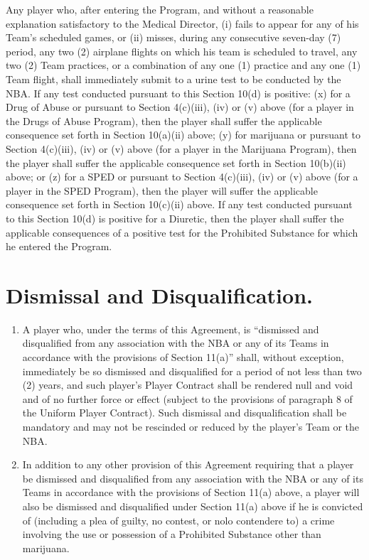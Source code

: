 \documentclass[
]{book}
\providecommand{\tightlist}{%
  \setlength{\itemsep}{0pt}\setlength{\parskip}{0pt}}
\begin{document}
\begin{enumerate}
  Any player who, after entering the Program, and without a reasonable explanation satisfactory to the Medical Director, (i) fails to appear for any of his Team's scheduled games, or (ii) misses, during any consecutive seven-day (7) period, any two (2) airplane flights on which his team is scheduled to travel, any two (2) Team practices, or a combination of any one (1) practice and any one (1) Team flight, shall immediately submit to a urine test to be conducted by the NBA. If any test conducted pursuant to this Section 10(d) is positive: (x) for a Drug of Abuse or pursuant to Section 4(c)(iii), (iv) or (v) above (for a player in the Drugs of Abuse Program), then the player shall suffer the applicable consequence set forth in Section 10(a)(ii) above; (y) for marijuana or pursuant to Section 4(c)(iii), (iv) or (v) above (for a player in the Marijuana Program), then the player shall suffer the applicable consequence set forth in Section 10(b)(ii) above; or (z) for a SPED or pursuant to Section 4(c)(iii), (iv) or (v) above (for a player in the SPED Program), then the player will suffer the applicable consequence set forth in Section 10(c)(ii) above. If any test conducted pursuant to this Section 10(d) is positive for a Diuretic, then the player shall suffer the applicable consequences of a positive test for the Prohibited Substance for which he entered the Program.
\end{enumerate}

\hypertarget{dismissal-and-disqualification.}{%
\section{Dismissal and Disqualification.}\label{dismissal-and-disqualification.}}

\begin{enumerate}
\def\labelenumi{(\alph{enumi})}
\tightlist
\item
  A player who, under the terms of this Agreement, is ``dismissed and disqualified from any association with the NBA or any of its Teams in accordance with the provisions of Section 11(a)'' shall, without exception, immediately be so dismissed and disqualified for a period of not less than two (2) years, and such player's Player Contract shall be rendered null and void and of no further force or effect (subject to the provisions of paragraph 8 of the Uniform Player Contract). Such dismissal and disqualification shall be mandatory and may not be rescinded or reduced by the player's Team or the NBA.
\item
  In addition to any other provision of this Agreement requiring that a player be dismissed and disqualified from any association with the NBA or any of its Teams in accordance with the provisions of Section 11(a) above, a player will also be dismissed and disqualified under Section 11(a) above if he is convicted of (including a plea of guilty, no contest, or nolo contendere to) a crime involving the use or possession of a Prohibited Substance other than marijuana.
\end{enumerate}
\end{document}
